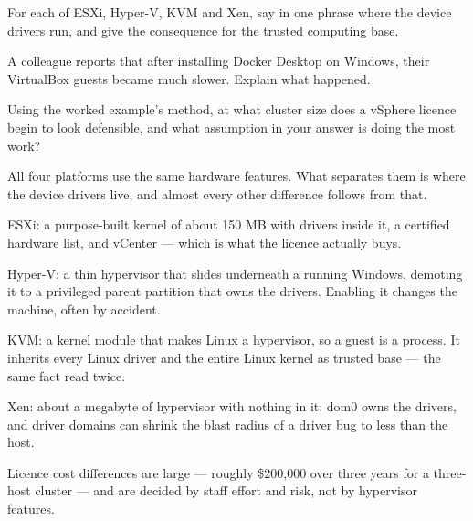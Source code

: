 \begin{checkpoint}
\begin{tightnum}
  \item For each of ESXi, Hyper-V, KVM and Xen, say in one phrase where the
        device drivers run, and give the consequence for the trusted computing
        base.
  \item A colleague reports that after installing Docker Desktop on Windows,
        their VirtualBox guests became much slower. Explain what happened.
  \item Using the worked example's method, at what cluster size does a vSphere
        licence begin to look defensible, and what assumption in your answer is
        doing the most work?
\end{tightnum}
\end{checkpoint}

\begin{chaptersummary}
\begin{tight}
  \item All four platforms use the same hardware features. What separates them
        is where the device drivers live, and almost every other difference
        follows from that.
  \item ESXi: a purpose-built kernel of about 150 MB with drivers inside it, a
        certified hardware list, and vCenter --- which is what the licence
        actually buys.
  \item Hyper-V: a thin hypervisor that slides underneath a running Windows,
        demoting it to a privileged parent partition that owns the drivers.
        Enabling it changes the machine, often by accident.
  \item KVM: a kernel module that makes Linux a hypervisor, so a guest is a
        process. It inherits every Linux driver and the entire Linux kernel as
        trusted base --- the same fact read twice.
  \item Xen: about a megabyte of hypervisor with nothing in it; dom0 owns the
        drivers, and driver domains can shrink the blast radius of a driver bug
        to less than the host.
  \item Licence cost differences are large --- roughly \$200{,}000 over three
        years for a three-host cluster --- and are decided by staff effort and
        risk, not by hypervisor features.
\end{tight}
\end{chaptersummary}


